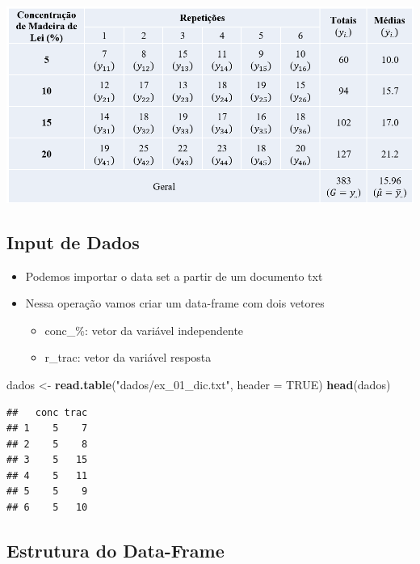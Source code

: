 \documentclass[
]{book}
\newenvironment{Shaded}{\begin{snugshade}}{\end{snugshade}}
\newcommand{\AttributeTok}[1]{\textcolor[rgb]{0.13,0.29,0.53}{#1}}
\newcommand{\ConstantTok}[1]{\textcolor[rgb]{0.56,0.35,0.01}{#1}}
\newcommand{\FunctionTok}[1]{\textcolor[rgb]{0.13,0.29,0.53}{\textbf{#1}}}
\newcommand{\NormalTok}[1]{#1}
\newcommand{\OtherTok}[1]{\textcolor[rgb]{0.56,0.35,0.01}{#1}}
\newcommand{\StringTok}[1]{\textcolor[rgb]{0.31,0.60,0.02}{#1}}
\providecommand{\tightlist}{%
  \setlength{\itemsep}{0pt}\setlength{\parskip}{0pt}}
\begin{document}
\includegraphics[width=1\linewidth]{imagens/tabela dic}

\subsection{Input de Dados}\label{input-de-dados}

\begin{itemize}
\tightlist
\item
  Podemos importar o data set a partir de um documento txt
\item
  Nessa operação vamos criar um data-frame com dois vetores

  \begin{itemize}
  \tightlist
  \item
    conc\_\%: vetor da variável independente
  \item
    r\_trac: vetor da variável resposta
  \end{itemize}
\end{itemize}

\begin{Shaded}
\begin{Highlighting}[]
\NormalTok{dados }\OtherTok{\textless{}{-}} \FunctionTok{read.table}\NormalTok{(}\StringTok{"dados/ex\_01\_dic.txt"}\NormalTok{, }\AttributeTok{header =} \ConstantTok{TRUE}\NormalTok{)}
\FunctionTok{head}\NormalTok{(dados)}
\end{Highlighting}
\end{Shaded}

\begin{verbatim}
##   conc trac
## 1    5    7
## 2    5    8
## 3    5   15
## 4    5   11
## 5    5    9
## 6    5   10
\end{verbatim}

\subsection{Estrutura do Data-Frame}\label{estrutura-do-data-frame}
\end{document}
